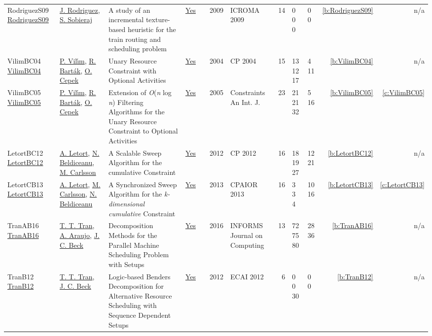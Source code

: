 {\begin{longtable}{>{\raggedright\arraybackslash}p{3cm}>{\raggedright\arraybackslash}p{4.5cm}>{\raggedright\arraybackslash}p{6.0cm}rrrp{2.5cm}rp{1cm}p{1cm}rr}
RodriguezS09 \href{}{RodriguezS09} & \hyperref[auth:a781]{J. Rodriguez}, \hyperref[auth:a1018]{S. Sobieraj} & A study of an incremental texture-based heuristic for the train routing and scheduling problem & \href{../works/RodriguezS09.pdf}{Yes} & \cite{RodriguezS09} & 2009 & ICROMA 2009 & 14 & 0 0 0 & 0 0 & \ref{b:RodriguezS09} & n/a\\
VilimBC04 \href{https://doi.org/10.1007/978-3-540-30201-8_8}{VilimBC04} & \hyperref[auth:a121]{P. Vil{\'{\i}}m}, \hyperref[auth:a152]{R. Bart{\'{a}}k}, \hyperref[auth:a161]{O. Cepek} & Unary Resource Constraint with Optional Activities & \href{../works/VilimBC04.pdf}{Yes} & \cite{VilimBC04} & 2004 & CP 2004 & 15 & 13 12 17 & 4 11 & \ref{b:VilimBC04} & n/a\\
VilimBC05 \href{https://doi.org/10.1007/s10601-005-2814-0}{VilimBC05} & \hyperref[auth:a121]{P. Vil{\'{\i}}m}, \hyperref[auth:a152]{R. Bart{\'{a}}k}, \hyperref[auth:a161]{O. Cepek} & Extension of \emph{O}(\emph{n} log \emph{n}) Filtering Algorithms for the Unary Resource Constraint to Optional Activities & \href{../works/VilimBC05.pdf}{Yes} & \cite{VilimBC05} & 2005 & Constraints An Int. J. & 23 & 21 21 32 & 5 16 & \ref{b:VilimBC05} & \ref{c:VilimBC05}\\
LetortBC12 \href{https://doi.org/10.1007/978-3-642-33558-7_33}{LetortBC12} & \hyperref[auth:a127]{A. Letort}, \hyperref[auth:a128]{N. Beldiceanu}, \hyperref[auth:a91]{M. Carlsson} & A Scalable Sweep Algorithm for the cumulative Constraint & \href{../works/LetortBC12.pdf}{Yes} & \cite{LetortBC12} & 2012 & CP 2012 & 16 & 18 19 27 & 12 21 & \ref{b:LetortBC12} & n/a\\
LetortCB13 \href{https://doi.org/10.1007/978-3-642-38171-3_10}{LetortCB13} & \hyperref[auth:a127]{A. Letort}, \hyperref[auth:a91]{M. Carlsson}, \hyperref[auth:a128]{N. Beldiceanu} & A Synchronized Sweep Algorithm for the \emph{k-dimensional cumulative} Constraint & \href{../works/LetortCB13.pdf}{Yes} & \cite{LetortCB13} & 2013 & CPAIOR 2013 & 16 & 3 3 4 & 10 16 & \ref{b:LetortCB13} & \ref{c:LetortCB13}\\
TranAB16 \href{https://doi.org/10.1287/ijoc.2015.0666}{TranAB16} & \hyperref[auth:a799]{T. T. Tran}, \hyperref[auth:a807]{A. Araujo}, \hyperref[auth:a89]{J. C. Beck} & Decomposition Methods for the Parallel Machine Scheduling Problem with Setups & \href{../works/TranAB16.pdf}{Yes} & \cite{TranAB16} & 2016 & \cellcolor{red!20}INFORMS Journal on Computing & 13 & 72 75 80 & 28 36 & \ref{b:TranAB16} & n/a\\
TranB12 \href{https://doi.org/10.3233/978-1-61499-098-7-774}{TranB12} & \hyperref[auth:a799]{T. T. Tran}, \hyperref[auth:a89]{J. C. Beck} & Logic-based Benders Decomposition for Alternative Resource Scheduling with Sequence Dependent Setups & \href{../works/TranB12.pdf}{Yes} & \cite{TranB12} & 2012 & ECAI 2012 & 6 & 0 0 30 & 0 0 & \ref{b:TranB12} & n/a\\

\end{longtable}}
